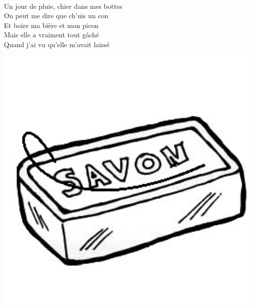 \\Un jour de pluie, chier dans mes bottes
\\On peut me dire que ch'uis un con
\\Et boire ma bière et mon picon
\\Mais elle a vraiment tout gâché
\\Quand j'ai vu qu'elle m'avait laissé
\bigskip
\bigskip
\begin{center}
\includegraphics[width=1\textwidth]{images/savon.jpg}
\end{center}

\breakpage